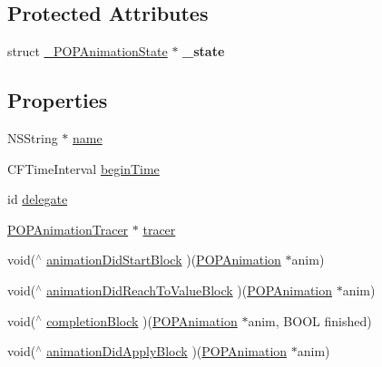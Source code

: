 \subsection*{Protected Attributes}
\begin{DoxyCompactItemize}
\item 
\mbox{\label{interface_p_o_p_animation_a1b1b7754474177fb9559b6aef5d8a612}} 
struct \mbox{\hyperlink{struct___p_o_p_animation_state}{\+\_\+\+P\+O\+P\+Animation\+State}} $\ast$ {\bfseries \+\_\+state}
\end{DoxyCompactItemize}
\subsection*{Properties}
\begin{DoxyCompactItemize}
\item 
N\+S\+String $\ast$ \mbox{\hyperlink{interface_p_o_p_animation_a021a12fa53c6acee3bd2726ae194e58a}{name}}
\item 
C\+F\+Time\+Interval \mbox{\hyperlink{interface_p_o_p_animation_a7cac25bf5f165045c6707fc26079cd42}{begin\+Time}}
\item 
id \mbox{\hyperlink{interface_p_o_p_animation_ab4000b657f7d991a1c2639c6bd787b70}{delegate}}
\item 
\mbox{\hyperlink{interface_p_o_p_animation_tracer}{P\+O\+P\+Animation\+Tracer}} $\ast$ \mbox{\hyperlink{interface_p_o_p_animation_a99f2f80821714cc3d9eaa1c2a70c12bc}{tracer}}
\item 
void($^\wedge$ \mbox{\hyperlink{interface_p_o_p_animation_aa014835f374d509dbb6b0ee1985e3523}{animation\+Did\+Start\+Block}} )(\mbox{\hyperlink{interface_p_o_p_animation}{P\+O\+P\+Animation}} $\ast$anim)
\item 
void($^\wedge$ \mbox{\hyperlink{interface_p_o_p_animation_adc69ed91e734a83006e8be24c0f9c2ac}{animation\+Did\+Reach\+To\+Value\+Block}} )(\mbox{\hyperlink{interface_p_o_p_animation}{P\+O\+P\+Animation}} $\ast$anim)
\item 
void($^\wedge$ \mbox{\hyperlink{interface_p_o_p_animation_ab1f8ca86441103080dd908be44631442}{completion\+Block}} )(\mbox{\hyperlink{interface_p_o_p_animation}{P\+O\+P\+Animation}} $\ast$anim, B\+O\+OL finished)
\item 
void($^\wedge$ \mbox{\hyperlink{interface_p_o_p_animation_ae7793f881ec2a41ed014a443154603fc}{animation\+Did\+Apply\+Block}} )(\mbox{\hyperlink{interface_p_o_p_animation}{P\+O\+P\+Animation}} $\ast$anim)
\item 

\end{DoxyCompactItemize}
